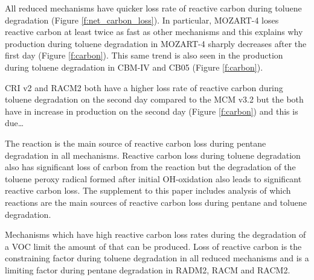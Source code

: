 All reduced mechanisms have quicker loss rate of reactive carbon during toluene degradation (Figure \ref{f:net_carbon_loss}).
In particular, MOZART-4 loses reactive carbon at least twice as fast as other mechanisms and this explains why  production during toluene degradation in MOZART-4 sharply decreases after the first day (Figure \ref{f:carbon}).
This same trend is also seen in the  production during toluene degradation in CBM-IV and CB05 (Figure \ref{f:carbon}).

CRI v2 and RACM2 both have a higher loss rate of reactive carbon during toluene degradation on the second day compared to the MCM v3.2 but the both have in increase in  production on the second day (Figure \ref{f:carbon}) and this is due\ldots

The  reaction is the main source of reactive carbon loss during pentane degradation in all mechanisms.
Reactive carbon loss during toluene degradation also has significant loss of carbon from the  reaction but the degradation of the toluene peroxy radical formed after initial OH-oxidation also leads to significant reactive carbon loss.
The supplement to this paper includes analysis of which reactions are the main sources of reactive carbon loss during pentane and toluene degradation.

Mechanisms which have high reactive carbon loss rates during the degradation of a VOC limit the amount of  that can be produced.
Loss of reactive carbon is the constraining factor during toluene degradation in all reduced mechanisms and is a limiting factor during pentane degradation in RADM2, RACM and RACM2.
